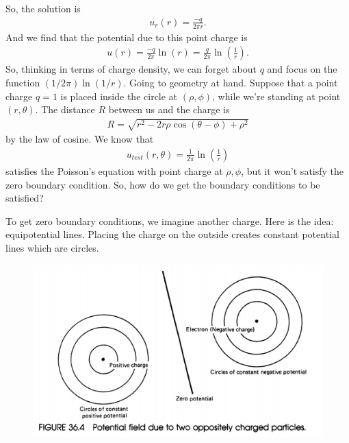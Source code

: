 \documentclass{book}
\theoremstyle{definition}
\newcommand{\f}[2]{\frac{#1}{#2}}
\newcommand{\lp}{\left(}
\newcommand{\rp}{\right)}
\begin{document}
So, the solution is
\begin{align*}
u_r(r) = \f{-q}{2\pi r}.
\end{align*}
And we find that the potential due to this point charge is
\begin{align*}
u(r) = \f{-q}{2\pi}\ln(r) = \f{q}{2\pi}\ln\lp \f{1}{r} \rp.
\end{align*}
So, thinking in terms of charge density, we can forget about $q$ and focus on the function $(1/2\pi) \ln(1/r)$. Going to geometry at hand. Suppose that a point charge $q=1$ is placed inside the circle at $(\rho,\phi)$, while we're standing at point $(r,\theta)$. The distance $R$ between us and the charge is
\begin{align*}
R = \sqrt{r^2 - 2r\rho\cos(\theta-\phi) + \rho^2}
\end{align*} 
by the law of cosine. We know that
\begin{align*}
u_{test}(r,\theta) = \f{1}{2\pi}\ln\lp \f{1}{r}\rp
\end{align*}
satisfies the Poisson's equation with point charge at $\rho,\phi$, but it won't satisfy the zero boundary condition. So, how do we get the boundary conditions  to be satisfied? 

To get zero boundary conditions, we imagine another charge. Here is the idea: equipotential lines. Placing the charge on the outside creates constant potential lines which are circles. 

\begin{figure}[h!]
	\centering
	\includegraphics[scale=0.5]{charge.png}
\end{figure}
\end{document}
